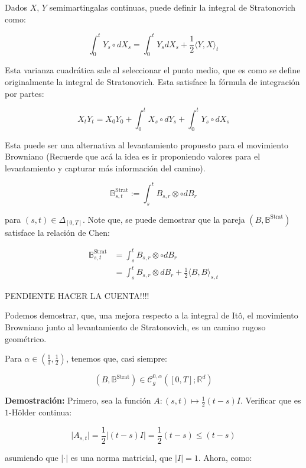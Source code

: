 Dados $X$, $Y$ semimartingalas continuas, puede definir la integral de Stratonovich como:

\[
	\int_0^t Y_s \circ dX_s = \int_0^t Y_s dX_s + \frac{1}{2} \langle Y, X \rangle_t
\]

Esta varianza cuadrática sale al seleccionar el punto medio, que es como se define originalmente la integral de Stratonovich. Esta satisface la fórmula de integración por partes:

\[
	X_t  Y_t = X_0 Y_0 + \int_0^t X_s \circ dY_s + \int_0^t Y_s \circ dX_s
\]

Esta puede ser una alternativa al levantamiento propuesto para el movimiento Browniano (Recuerde que acá la idea es ir proponiendo valores para el levantamiento y capturar más información del camino).

\[
	\mathbb{B}_{s,t}^{\text{Strat}} := \int_s^t B_{s,r} \otimes \circ dB_r
\]

para $(s,t) \in \Delta_{[0,T]}$. Note que, se puede demostrar que la pareja $(B, \mathbb{B}^{\text{Strat}})$ satisface la relación de Chen:

\begin{align*}
	\mathbb{B}_{s,t}^{\text{Strat}} &= \int_s^t B_{s,r} \otimes \circ dB_r \\
	&= \int_s^t B_{s,r} \otimes dB_r + \frac{1}{2} \langle B, B \rangle_{s,t}
\end{align*}

PENDIENTE HACER LA CUENTA!!!!

Podemos demostrar, que, una mejora respecto a la integral de Itô, el movimiento Browniano junto al levantamiento de Stratonovich, es un camino rugoso geométrico.

\begin{prop}
	Para $\alpha \in \left( \frac{1}{3}, \frac{1}{2} \right)$, tenemos que, casi siempre:

	\[
		(B, \mathbb{B}^{\text{Strat}}) \in \mathcal{C}_g^{0, \alpha} ([0,T]; \mathbb{R}^d)		
	\]

\end{prop}

\textbf{Demostración:} Primero, sea la función $A: (s,t) \mapsto \frac{1}{2}(t - s)I$.  Verificar que es $1$-Hölder continua:

\[
	\lvert A_{s,t} \rvert = \frac{1}{2} \lvert (t-s)I \rvert = \frac{1}{2} (t-s) \leq (t-s)
\]

asumiendo que $\lvert \cdot \rvert$ es una norma matricial, que $\lvert I \rvert = 1$. Ahora, como:

